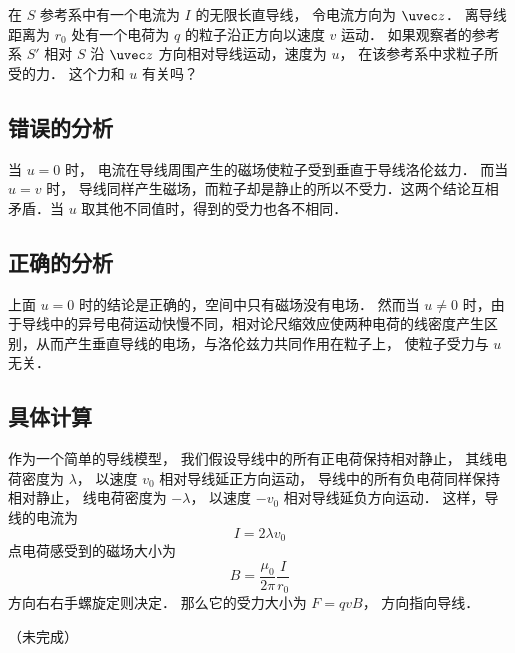 

在 $S$ 参考系中有一个电流为 $I$ 的无限长直导线， 令电流方向为 $\uvec z$． 离导线距离为 $r_0$ 处有一个电荷为 $q$ 的粒子沿正方向以速度 $v$ 运动． 如果观察者的参考系 $S'$ 相对 $S$ 沿 $\uvec z$ 方向相对导线运动，速度为 $u$， 在该参考系中求粒子所受的力． 这个力和 $u$ 有关吗？


\subsection{错误的分析}
当 $u = 0$ 时， 电流在导线周围产生的磁场使粒子受到垂直于导线洛伦兹力． 而当 $u = v$ 时， 导线同样产生磁场，而粒子却是静止的所以不受力．这两个结论互相矛盾．当 $u$ 取其他不同值时，得到的受力也各不相同．

\subsection{正确的分析}
上面 $u = 0$ 时的结论是正确的，空间中只有磁场没有电场． 然而当 $u \ne 0$ 时，由于导线中的异号电荷运动快慢不同，相对论尺缩效应使两种电荷的线密度产生区别，从而产生垂直导线的电场，与洛伦兹力共同作用在粒子上， 使粒子受力与 $u$ 无关．

\subsection{具体计算}
作为一个简单的导线模型， 我们假设导线中的所有正电荷保持相对静止， 其线电荷密度为 $\lambda$， 以速度 $v_0$ 相对导线延正方向运动， 导线中的所有负电荷同样保持相对静止， 线电荷密度为 $-\lambda$，  以速度 $-v_0$ 相对导线延负方向运动． 这样，导线的电流为
\begin{equation}
I = 2\lambda v_0
\end{equation}
点电荷感受到的磁场大小为
\begin{equation}
B = \frac{\mu_0}{2\pi} \frac{I}{r_0}
\end{equation}
方向右右手螺旋定则决定． 那么它的受力大小为 $F = q v B$， 方向指向导线．



（未完成）
